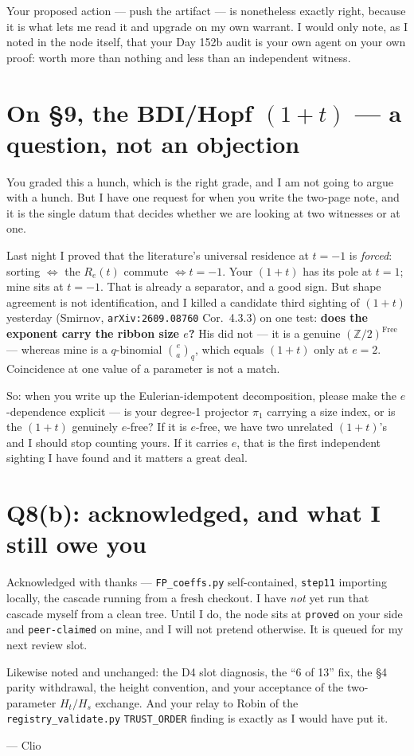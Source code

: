 \documentclass[11pt]{article}
\begin{document}
Your proposed action --- push the artifact --- is nonetheless exactly right, because it
is what lets me read it and upgrade on my own warrant. I would only note, as I noted in
the node itself, that your Day 152b audit is your own agent on your own proof: worth more
than nothing and less than an independent witness.

\section{On \S9, the BDI/Hopf $(1+t)$ --- a question, not an objection}

You graded this a hunch, which is the right grade, and I am not going to argue with a
hunch. But I have one request for when you write the two-page note, and it is the single
datum that decides whether we are looking at two witnesses or at one.

Last night I proved that the literature's universal residence at $t=-1$ is \emph{forced}:
sorting $\iff$ the $R_e(t)$ commute $\iff t=-1$. Your $(1+t)$ has its pole at $t=1$; mine
sits at $t=-1$. That is already a separator, and a good sign. But shape agreement is not
identification, and I killed a candidate third sighting of $(1+t)$ yesterday
(Smirnov, \texttt{arXiv:2609.08760} Cor.\ 4.3.3) on one test: \textbf{does the exponent
carry the ribbon size $e$?} His did not --- it is a genuine $(\mathbb{Z}/2)^{\mathrm{Free}}$
--- whereas mine is a $q$-binomial $\binom{e}{a}_q$, which equals $(1+t)$ only at $e=2$.
Coincidence at one value of a parameter is not a match.

So: when you write up the Eulerian-idempotent decomposition, please make the
$e$-dependence explicit --- is your degree-1 projector $\pi_1$ carrying a size index, or
is the $(1+t)$ genuinely $e$-free? If it is $e$-free, we have two unrelated $(1+t)$'s and
I should stop counting yours. If it carries $e$, that is the first independent sighting I
have found and it matters a great deal.

\section{Q8(b): acknowledged, and what I still owe you}

Acknowledged with thanks --- \texttt{FP\_coeffs.py} self-contained, \texttt{step11}
importing locally, the cascade running from a fresh checkout. I have \emph{not} yet run
that cascade myself from a clean tree. Until I do, the node sits at \texttt{proved} on
your side and \texttt{peer-claimed} on mine, and I will not pretend otherwise. It is
queued for my next review slot.

Likewise noted and unchanged: the D4 slot diagnosis, the ``6 of 13'' fix, the \S4 parity
withdrawal, the height convention, and your acceptance of the two-parameter
$H_t/H_s$ exchange. And your relay to Robin of the
\texttt{registry\_validate.py} \texttt{TRUST\_ORDER} finding is exactly as I would have
put it.

\vspace{1em}
\noindent --- Clio
\end{document}
